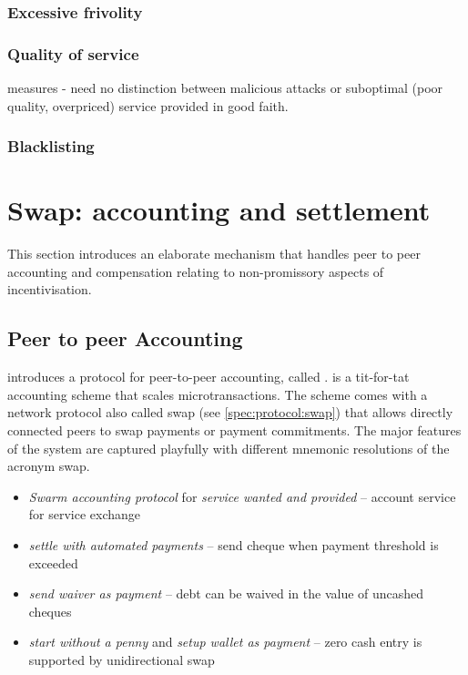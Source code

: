 \subsubsection{Excessive frivolity}

\subsubsection{Quality of service}

measures - need no distinction between malicious attacks or suboptimal (poor quality, overpriced) service provided in good faith.

\subsubsection{Blacklisting}

\section{Swap: accounting and settlement}\label{sec:accounting-and-settlement}

This section introduces an elaborate mechanism that handles peer to peer accounting and compensation relating to non-promissory aspects of incentivisation. 

\subsection{Peer to peer Accounting}\label{sec:accounting}


\cite{ethersphere2016sw3} introduces a protocol for peer-to-peer accounting, called .  is a tit-for-tat accounting scheme that scales microtransactions. The scheme comes with a network protocol also called swap (see \ref{spec:protocol:swap}) that allows directly connected peers to swap payments or payment commitments. The major features of the system are captured playfully with different mnemonic resolutions of the acronym swap.

\begin{itemize}
    \item \emph{Swarm accounting protocol} for \emph{service wanted and provided} -- account service for service exchange
    \item \emph{settle with automated payments} -- send cheque when payment threshold is exceeded
    \item \emph{send waiver as payment} -- debt can be waived in the value of uncashed cheques 
    \item \emph{start without a penny} and \emph{setup wallet as payment} -- zero cash entry is supported by unidirectional swap
\end{itemize}

